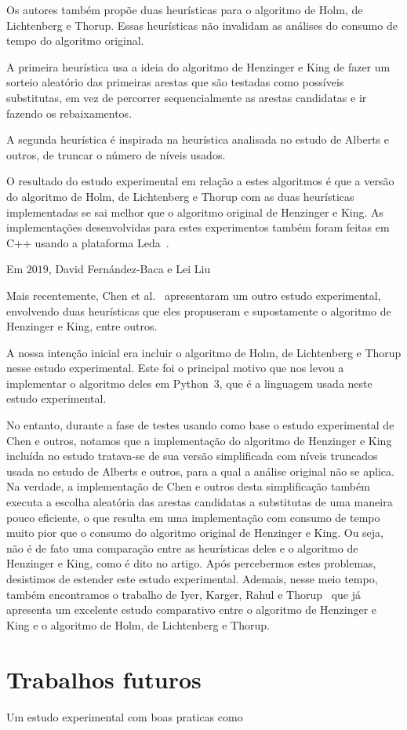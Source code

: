 Os autores também propõe duas heurísticas para o algoritmo de Holm, de Lichtenberg e Thorup. Essas heurísticas não invalidam as análises do consumo de tempo do algoritmo original.

A primeira heurística usa a ideia do algoritmo de Henzinger e King de fazer um sorteio aleatório das primeiras arestas que são testadas como possíveis substitutas, em vez de percorrer sequencialmente as arestas candidatas e ir fazendo os rebaixamentos.

A segunda heurística é inspirada na heurística analisada no estudo de Alberts e outros, de truncar o número de níveis usados.

O resultado do estudo experimental em relação a estes algoritmos é que a versão do algoritmo de Holm, de Lichtenberg e Thorup com as duas heurísticas implementadas se sai melhor que o algoritmo original de Henzinger e King.
As implementações desenvolvidas para estes experimentos também foram feitas em C++ usando a plataforma Leda~\cite{LEDA}.


Em $2019$, David Fernández-Baca e Lei Liu~\cite{xp-Phylogeny}


Mais recentemente, Chen et al.~\cite{QC22} apresentaram um outro estudo experimental, envolvendo duas heurísticas que eles propuseram e supostamente o algoritmo de Henzinger e King, entre outros.

A nossa intenção inicial era incluir o algoritmo de Holm, de Lichtenberg e Thorup nesse estudo experimental. Este foi o principal motivo que nos levou a implementar o algoritmo deles em Python~3, que é a linguagem usada neste estudo experimental.

No entanto, durante a fase de testes usando como base o estudo experimental de Chen e outros, notamos que a implementação do algoritmo de Henzinger e King incluída no estudo tratava-se de sua versão simplificada com níveis truncados usada no estudo de Alberts e outros, para a qual a análise original não se aplica.
Na verdade, a implementação de Chen e outros desta simplificação também executa a escolha aleatória das arestas candidatas a substitutas de uma maneira pouco eficiente, o que resulta em uma implementação com consumo de tempo muito pior que o consumo do algoritmo original de Henzinger e King.
Ou seja, não é de fato uma comparação entre as heurísticas deles e o algoritmo de Henzinger e King, como é dito no artigo.
Após percebermos estes problemas, desistimos de estender este estudo experimental.
Ademais, nesse meio tempo, também encontramos o trabalho de Iyer, Karger, Rahul e Thorup~\cite{EmpiricalStudy2002} que já apresenta um excelente estudo comparativo entre o algoritmo de Henzinger e King e o algoritmo de Holm, de Lichtenberg e Thorup. 

\section{Trabalhos futuros}

Um estudo experimental com boas praticas como~\cite{guideXP1999}
